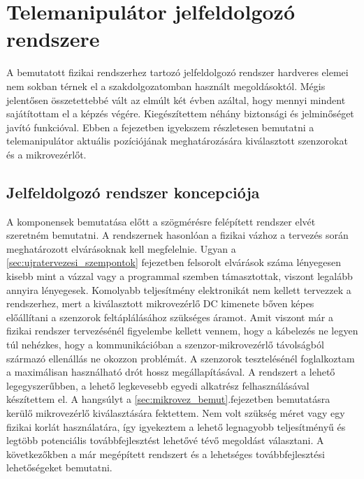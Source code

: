 \chapter{Telemanipulátor jelfeldolgozó rendszere}
\label{sec:elektronika}

A bemutatott fizikai rendszerhez tartozó jelfeldolgozó rendszer hardveres elemei nem sokban térnek el a szakdolgozatomban használt megoldásoktól. Mégis jelentősen összetettebbé vált az elmúlt két évben azáltal, hogy mennyi mindent sajátítottam el a képzés végére. Kiegészítettem néhány biztonsági és jelminőséget javító funkcióval. Ebben a fejezetben igyekszem részletesen bemutatni a telemanipulátor aktuális pozíciójának meghatározására kiválasztott szenzorokat és a mikrovezérlőt.

\section{Jelfeldolgozó rendszer koncepciója}

A komponensek bemutatása előtt a szögmérésre felépített rendszer elvét szeretném bemutatni. A rendszernek hasonlóan a fizikai vázhoz a tervezés során meghatározott elvárásoknak kell megfelelnie. Ugyan a \ref{sec:ujratervezesi_szempontok} fejezetben felsorolt elvárások száma lényegesen kisebb mint a vázzal vagy a programmal szemben támasztottak, viszont legalább annyira lényegesek. Komolyabb teljesítmény elektronikát nem kellett tervezzek a rendszerhez, mert a kiválasztott mikrovezérlő DC kimenete bőven képes előállítani a szenzorok feltáplálásához szükséges áramot. Amit viszont már a fizikai rendszer tervezésénél figyelembe kellett vennem, hogy a kábelezés ne legyen túl nehézkes, hogy a kommunikációban a szenzor-mikrovezérlő távolságból származó ellenállás ne okozzon problémát. A szenzorok tesztelésénél foglalkoztam a maximálisan használható drót hossz megállapításával. A rendszert a lehető legegyszerűbben, a lehető legkevesebb egyedi alkatrész felhasználásával készítettem el. A hangsúlyt a \ref{sec:mikrovez_bemut}.fejezetben bemutatásra kerülő mikrovezérlő kiválasztására fektettem. Nem volt szükség méret vagy egy fizikai korlát használatára, így igyekeztem a lehető legnagyobb teljesítményű és legtöbb potenciális továbbfejlesztést lehetővé tévő megoldást választani. A következőkben a már megépített rendszert és a lehetséges továbbfejlesztési lehetőségeket bemutatni.

